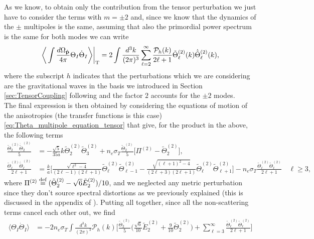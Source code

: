 As we know, to obtain only the contribution from the tensor perturbation we just have to consider the terms with $m=\pm2$ and, since we know that the dynamics of the $\pm$ multipoles is the same, assuming that also the primordial power spectrum is the same for both modes we can write $$\bigg\langle\int\frac{d\Omega_{\mathbf{\hat{p}}}}{4\pi}\Theta_I\dot \Theta_I\bigg\rangle\bigg|_\text{T}=2\int\frac{d^3k}{(2\pi)^3}\sum_{\ell=2}^{\infty}\frac{\mathcal{P}_h (k)}{2\ell+1}\tilde\Theta_\ell^{(2)}(k)\dot{\tilde\Theta}_{\ell}^{(2)}(k),$$
where the subscript $h$ indicates that the perturbations which we are considering are the gravitational waves in the basis we introduced in Section \ref{sec:TensorCoupling} following \cite{HuWhite} and the factor $2$ accounts for the $\pm2$  modes.\\ The final expression is then obtained by considering the equations of motion of the anisotropies (the transfer functions is this case) \eqref{eq:Theta_multipole_equation_tensor} that give, for the product in the above, the following terms
\begin{align*}
    \frac{\tilde\Theta_2^{(2)}\dot{\tilde\Theta}_2^{(2)}}{5}&=-\frac{\sqrt{5}}{35a}k\tilde\Theta_2^{(2)}\tilde\Theta_3^{(2)}+n_e\sigma_T\frac{\tilde\Theta_2^{(2)}}{5}\bigg[\Pi^{(2)}-\tilde\Theta_{2}^{(2)}\bigg],\\
    \frac{\tilde\Theta_\ell^{(2)}\dot{\tilde\Theta}_\ell^{(2)}}{2\ell+1}&=\frac{k}{a}\bigg[\frac{\sqrt{\ell^2-4}}{(2\ell-1)(2\ell+1)}\tilde\Theta_\ell^{(2)}\tilde\Theta_{\ell-1}^{(2)}-\frac{\sqrt{(\ell+1)^2-4}}{(2\ell+3)(2\ell+1)}\tilde\Theta_\ell^{(2)}\tilde\Theta_{\ell+1}^{(2)}\bigg]-n_e\sigma_T\frac{\tilde\Theta_\ell^{(2)}\tilde\Theta_{\ell}^{(2)}}{2\ell+1}\quad \ell\geq3,
\end{align*}
where $\Pi^{(2)}\stackrel{\text{def}}{=}(\tilde\Theta_2^{(2)}-\sqrt{6}\tilde E_2^{(2)})/10$, and we neglected any metric perturbation since they don't source spectral distortions as we previously explained (this is discussed in the appendix of \cite{Chluba_tens_diss}). Putting all together, since all the non-scattering terms cancel each other out, we find
\begin{align}
    \langle\Theta_I\dot \Theta_I\rangle&=-2n_e\sigma_T\int\frac{d^3k}{(2\pi)^3}\mathcal{P}_h (k)\bigg[\frac{\tilde\Theta_2^{(2)}}{5}\bigg(\frac{\sqrt{6}}{10}\tilde E_2^{(2)}+\frac{9}{10}\tilde\Theta_{2}^{(2)}\bigg)+\sum_{\ell=3}^{\infty}\frac{\tilde\Theta_\ell^{(2)}\tilde\Theta_\ell^{(2)}}{2\ell+1}\bigg]
    \label{eq:TT_I_average_tensor}
\end{align}
 
